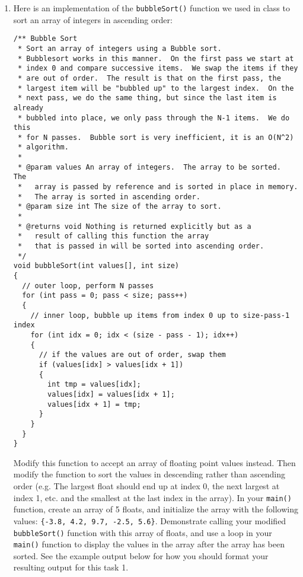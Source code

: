 \documentclass[11pt]{article}
\begin{document}
\begin{enumerate}
\item Here is an implementation of the \verb~bubbleSort()~ function we
   used in class to sort an array of integers in ascending
   order:

\begin{verbatim}
/** Bubble Sort
 * Sort an array of integers using a Bubble sort.
 * Bubblesort works in this manner.  On the first pass we start at
 * index 0 and compare successive items.  We swap the items if they
 * are out of order.  The result is that on the first pass, the
 * largest item will be "bubbled up" to the largest index.  On the
 * next pass, we do the same thing, but since the last item is already
 * bubbled into place, we only pass through the N-1 items.  We do this
 * for N passes.  Bubble sort is very inefficient, it is an O(N^2)
 * algorithm.
 *
 * @param values An array of integers.  The array to be sorted.  The
 *   array is passed by reference and is sorted in place in memory.
 *   The array is sorted in ascending order.
 * @param size int The size of the array to sort.
 *
 * @returns void Nothing is returned explicitly but as a
 *   result of calling this function the array
 *   that is passed in will be sorted into ascending order.
 */
void bubbleSort(int values[], int size)
{
  // outer loop, perform N passes
  for (int pass = 0; pass < size; pass++)
  {
    // inner loop, bubble up items from index 0 up to size-pass-1 index
    for (int idx = 0; idx < (size - pass - 1); idx++)
    {
      // if the values are out of order, swap them
      if (values[idx] > values[idx + 1])
      {
        int tmp = values[idx];
        values[idx] = values[idx + 1];
        values[idx + 1] = tmp;
      }
    }
  }
}
\end{verbatim}
   Modify this function to accept an array of floating point values
   instead.  Then modify the function to sort the values in descending
   rather than ascending order (e.g. The largest float should end up
   at index 0, the next largest at index 1, etc. and the smallest at
   the last index in the array).  In your \verb~main()~ function, create an
   array of 5 floats, and initialize the array with the following
   values: \verb~{-3.8, 4.2, 9.7, -2.5, 5.6}~.  Demonstrate calling your
   modified \verb~bubbleSort()~ function with this array of floats, and use
   a loop in your \verb~main()~ function to display the values in the array
   after the array has been sorted.  See the example output below for
   how you should format your resulting output for this task 1.

\end{enumerate}
\end{document}
